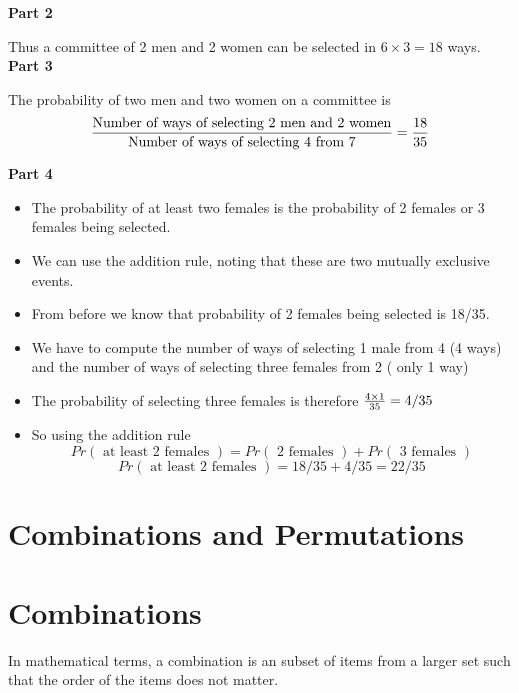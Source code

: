 \documentclass[12pt]{report}
\begin{document}
		{\Large
			
			\textbf{Part 2}
			
			Thus a committee of 2 men and 2 women can be selected in $ 6 \times 3  = 18 $ ways.\\
			\bigskip
			\textbf{Part 3}
			
			The probability of two men and two women on a committee is
			\[ {\mbox{Number of ways of selecting 2 men and 2 women} \over \mbox{Number of ways of selecting 4 from 7}} = {18 \over 35 }\]
			
		}
		{\Large
			
			\textbf{Part 4}
			\begin{itemize}
				\item The probability of at least two females is the probability of 2 females or 3 females being selected.
				\item We can use the addition rule, noting that these are two mutually exclusive events.
				\item From before we know that probability of 2 females being selected is 18/35.
			\end{itemize}
			
		}
		{\Large

			\begin{itemize}
				\item We have to compute the number of ways of selecting 1 male from 4 (4 ways) and the number of ways of selecting three females from 2 ( only 1 way)
				\item The probability of selecting three females is therefore ${4 \times 1 \over 35} = 4/35$
				\item So using the addition rule
				\[ Pr(\mbox{ at least 2 females }) = Pr(\mbox{ 2 females }) + Pr(\mbox{ 3 females }) \]
				\[ Pr(\mbox{ at least 2 females })  = 18/35 + 4/35 = 22/35 \]
			\end{itemize}
			
		}
\newpage		
		\section*{Combinations and Permutations }
		\section*{Combinations}
		In mathematical terms, a combination is an subset of items from a larger set such that the order of the items does not matter.
		
\end{document}
